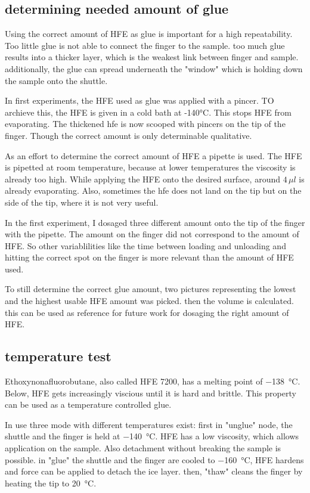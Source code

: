 \subsection{determining needed amount of glue}

Using the correct amount of HFE as glue is important for a high repeatability. Too little glue is not able to connect the finger to the sample. too much glue results into a thicker layer, which is the weakest link between finger and sample. additionally, the glue can spread underneath the "window" which is holding down the sample onto the shuttle. 

In first experiments, the HFE used as glue was applied with a pincer. TO archieve this, the HFE is given in a cold bath at -140°C. This stops HFE from evaporating. The thickened hfe is now scooped with pincers on the tip of the finger. Though the correct amount is only determinable qualitative.

As an effort to determine the correct amount of HFE a pipette is used. The HFE is pipetted at room temperature, because at lower temperatures the viscosity is already too high. While applying the HFE onto the desired surface, around $4\,\mu l$ is already evaporating. Also, sometimes the hfe does not land on the tip but on the side of the tip, where it is not very useful. 

In the first experiment, I dosaged three different amount onto the tip of the finger with the pipette. The amount on the finger did not correspond to the amount of HFE. So other variablilities like the time between loading and unloading and hitting the correct spot on the finger is more relevant than the amount of HFE used.

To still determine the correct glue amount, two pictures representing the lowest and the highest usable HFE amount was picked. then the volume is calculated. this can be used as reference for future work for dosaging the right amount of HFE.

\subsection{temperature test}

Ethoxynonafluorobutane, also called HFE 7200, has a melting point of \SI{-138}{\degreeCelsius}. Below, HFE gets increasingly viscious until it is hard and brittle. This property can be used as a temperature controlled glue. 

In use three mode with different temperatures exist: first in "unglue" node, the shuttle and the finger is held at \SI{-140}{\degreeCelsius}. HFE has a low viscosity, which allows application on the sample. Also detachment without breaking the sample is possible. in "glue" the shuttle and the finger are cooled to \SI{-160}{\degreeCelsius}, HFE hardens and force can be applied to detach the ice layer. then, "thaw" cleans the finger by heating the tip to \SI{20}{\degreeCelsius}. 

